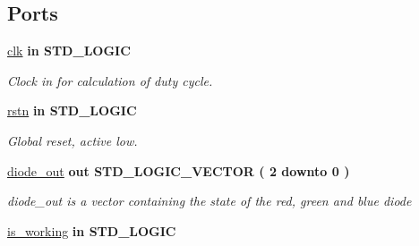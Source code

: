 \subsection*{Ports}
 \begin{DoxyCompactItemize}
\item 
\hypertarget{classRGB__diode__controller_a8120037e0ee47c35ba2d79242209c72e}{\hyperlink{classRGB__diode__controller_a8120037e0ee47c35ba2d79242209c72e}{clk}  {\bfseries {\bfseries \textcolor{vhdlkeyword}{in}\textcolor{vhdlchar}{ }}} {\bfseries \textcolor{comment}{S\-T\-D\-\_\-\-L\-O\-G\-I\-C}\textcolor{vhdlchar}{ }} }\label{classRGB__diode__controller_a8120037e0ee47c35ba2d79242209c72e}

\begin{DoxyCompactList}\small\item\em Clock in for calculation of duty cycle. \end{DoxyCompactList}\item 
\hypertarget{classRGB__diode__controller_aba021aec4b477b89079bb58ccadcc67e}{\hyperlink{classRGB__diode__controller_aba021aec4b477b89079bb58ccadcc67e}{rstn}  {\bfseries {\bfseries \textcolor{vhdlkeyword}{in}\textcolor{vhdlchar}{ }}} {\bfseries \textcolor{comment}{S\-T\-D\-\_\-\-L\-O\-G\-I\-C}\textcolor{vhdlchar}{ }} }\label{classRGB__diode__controller_aba021aec4b477b89079bb58ccadcc67e}

\begin{DoxyCompactList}\small\item\em Global reset, active low. \end{DoxyCompactList}\item 
\hypertarget{classRGB__diode__controller_a0ee3d978fb8b47588b62e4a768c780fe}{\hyperlink{classRGB__diode__controller_a0ee3d978fb8b47588b62e4a768c780fe}{diode\-\_\-out}  {\bfseries {\bfseries \textcolor{vhdlkeyword}{out}\textcolor{vhdlchar}{ }}} {\bfseries \textcolor{comment}{S\-T\-D\-\_\-\-L\-O\-G\-I\-C\-\_\-\-V\-E\-C\-T\-O\-R}\textcolor{vhdlchar}{ }\textcolor{vhdlchar}{(}\textcolor{vhdlchar}{ }\textcolor{vhdlchar}{ } \textcolor{vhdldigit}{2} \textcolor{vhdlchar}{ }\textcolor{vhdlchar}{ }\textcolor{vhdlchar}{ }\textcolor{vhdlkeyword}{downto}\textcolor{vhdlchar}{ }\textcolor{vhdlchar}{ }\textcolor{vhdlchar}{ } \textcolor{vhdldigit}{0} \textcolor{vhdlchar}{ }\textcolor{vhdlchar}{)}\textcolor{vhdlchar}{ }} }\label{classRGB__diode__controller_a0ee3d978fb8b47588b62e4a768c780fe}

\begin{DoxyCompactList}\small\item\em diode\-\_\-out is a vector containing the state of the red, green and blue diode \end{DoxyCompactList}\item 
\hypertarget{classRGB__diode__controller_a2027e6e92931979514fdb7cba1fa3b03}{\hyperlink{classRGB__diode__controller_a2027e6e92931979514fdb7cba1fa3b03}{is\-\_\-working}  {\bfseries {\bfseries \textcolor{vhdlkeyword}{in}\textcolor{vhdlchar}{ }}} {\bfseries \textcolor{comment}{S\-T\-D\-\_\-\-L\-O\-G\-I\-C}\textcolor{vhdlchar}{ }} }\label{classRGB__diode__controller_a2027e6e92931979514fdb7cba1fa3b03}


\end{DoxyCompactItemize}
